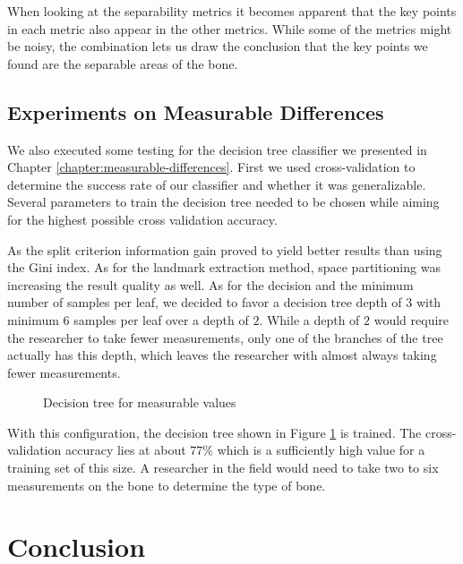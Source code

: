 \documentclass[pdftex,12pt,a4paper]{report}
\begin{document}
When looking at the separability metrics it becomes apparent that the key points in each metric also appear in the other metrics. While some of the metrics might be noisy, the combination lets us draw the conclusion that the key points we found are the separable areas of the bone.

\section{Experiments on Measurable Differences}

We also executed some testing for the decision tree classifier we presented in Chapter \ref{chapter:measurable-differences}. First we used cross-validation to determine the success rate of our classifier and whether it was generalizable. Several parameters to train the decision tree needed to be chosen while aiming for the highest possible cross validation accuracy.

As the split criterion information gain proved to yield better results than using the Gini index. As for the landmark extraction method, space partitioning was increasing the result quality as well. As for the decision and the minimum number of samples per leaf, we decided to favor a decision tree depth of $3$ with minimum $6$ samples per leaf over a depth of $2$. While a depth of $2$ would require the researcher to take fewer measurements, only one of the branches of the tree actually has this depth, which leaves the researcher with almost always taking fewer measurements.

\begin{figure}[h]
	\centering
	\begin{subfigure}[b]{0.9\textwidth}
		\centering
		
	\end{subfigure}
	\caption{Decision tree for measurable values}
	\label{fig:result-decision-tree}
\end{figure}

With this configuration, the decision tree shown in Figure \ref{fig:result-decision-tree} is trained. The cross-validation accuracy lies at about $77\%$ which is a sufficiently high value for a training set of this size. A researcher in the field would need to take two to six measurements on the bone to determine the type of bone.

\chapter{Conclusion}
\end{document}
